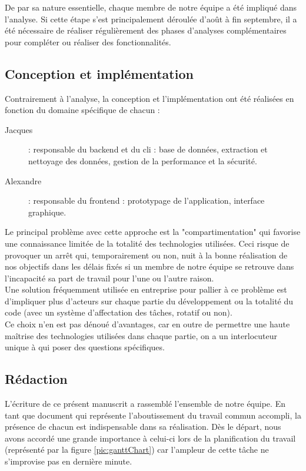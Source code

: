 De par sa nature essentielle, chaque membre de notre équipe a été impliqué dans l'analyse. Si cette étape s'est principalement déroulée d'août à fin septembre, il a été nécessaire de réaliser régulièrement des phases d'analyses complémentaires pour compléter ou réaliser des fonctionnalités.

\subsection*{Conception et implémentation}

Contrairement à l'analyse, la conception et l'implémentation ont été réalisées en fonction du domaine spécifique de chacun : 

\begin{description}
    \item[Jacques] : responsable du \gls{backend} et du \Gls{cli} : base de données, extraction et nettoyage des données, gestion de la performance et la sécurité.
    \item[Alexandre] : responsable du \gls{frontend} : prototypage de l'application, interface graphique.
\end{description}

Le principal problème avec cette approche est la "compartimentation" qui favorise une connaissance limitée de la totalité des technologies utilisées. Ceci risque de provoquer un arrêt qui, temporairement ou non, nuit à la bonne réalisation de nos objectifs dans les délais fixés si un membre de notre équipe se retrouve dans l'incapacité sa part de travail pour l'une ou l'autre raison. \\

Une solution fréquemment utilisée en entreprise pour pallier à ce problème est d'impliquer plus d'acteurs sur chaque partie du développement ou la totalité du code (avec un système d'affectation des tâches, rotatif ou non). \\

Ce choix n'en est pas dénoué d'avantages, car en outre de permettre une haute maîtrise des technologies utilisées dans chaque partie, on a un interlocuteur unique à qui poser des questions spécifiques.

\subsection*{Rédaction}


L'écriture de ce présent manuscrit a rassemblé l'ensemble de notre équipe. En tant que document qui représente l'aboutissement du travail commun accompli, la présence de chacun est indispensable dans sa réalisation. Dès le départ, nous avons accordé une grande importance à celui-ci lors de la planification du travail (représenté par la figure \ref{pic:ganttChart}) car l'ampleur de cette tâche ne s'improvise pas en dernière minute. \\

